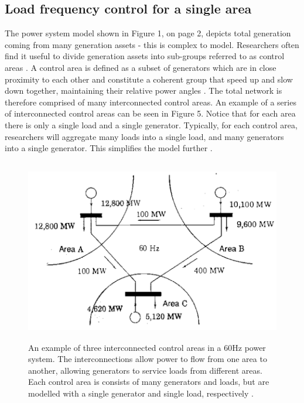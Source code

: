 \documentclass[12pt, a4paper]{article}
\begin{document}
\subsection{Load frequency control for a single area}
The power system model shown in Figure 1, on page 2, depicts total generation coming from many generation assets - this is complex to model. Researchers often find it useful to divide generation assets into sub-groups referred to as control areas \cite{Kothari2011}. A control area is defined as a subset of generators which are in close proximity to each other and constitute a coherent group that speed up and slow down together, maintaining their relative power angles \cite{Kothari2011}. The total network is therefore comprised of many interconnected control areas. An example of a series of interconnected control areas can be seen in Figure 5. Notice that for each area there is only a single load and a single generator. Typically, for each control area, researchers will aggregate many loads into a single load, and many generators into a single generator. This simplifies the model further \cite{Grainger1994}.
\begin{figure}[h]
	\centering
	\includegraphics[height=8cm]{multiple_area_system}
	\caption{An example of three interconnected control areas in a 60$\si{\hertz}$ power system. The interconnections allow power to flow from one area to another, allowing generators to service loads from different areas. Each control area is consists of many generators and loads, but are modelled with a single generator and single load, respectively \cite{Grainger1994}.}
\end{figure}
\end{document}
